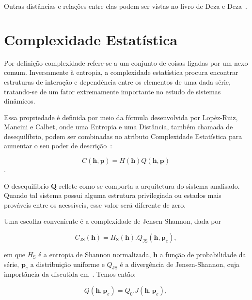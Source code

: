 Outras distâncias e relações entre elas podem ser vistas no livro de Deza e Deza~\citep{EncyclopediaofDistances}.

\section{Complexidade Estatística}

Por definição complexidade refere-se a um conjunto de coisas ligadas por um nexo comum. Inversamente à entropia, a complexidade estatística procura encontrar estruturas de interação e dependência entre os elementos de uma dada série, tratando-se de um fator extremamente importante no estudo de sistemas dinâmicos.

Essa propriedade é definida por meio da fórmula desenvolvida por Lopèz-Ruiz, Mancini e Calbet, onde uma Entropia e uma Distância, também chamada de desequilíbrio, podem ser combinadas no atributo Complexidade Estatística para aumentar o seu poder de descrição~\citep{article5,FELDMAN1998244,LOPEZRUIZ1995321}:

\begin{equation}
C(\bm h, \bm p) = H(\bm h)Q(\bm h, \bm p)
\end{equation}.

O desequilibrio $\bm Q$ reflete como se comporta a arquitetura do sistema analisado. Quando tal sistema possui alguma estrutura privilegiada ou estados mais prováveis entre os acessíveis, esse valor será diferente de zero.


Uma escolha conveniente é a complexidade de Jensen-Shannon, dada por

 \begin{equation}
 C_{\text{JS}}(\bm h) = H_{\text{S}}(\bm h) . Q_{\text{JS}}(\bm h, \bm p_e),
 \end{equation}
 
em que $H_{\text{S}}$ é a entropia de Shannon normalizada, $\bm h$ a função de probabilidade da série, $\bm p_e$ a distribuição uniforme e $Q_{\text{JS}}$ é a divergência de Jensen-Shannon, cuja importância da discutida em~\cite{LAMBERTI2004119}. Temos então:

\begin{equation}
Q(\bm h, \bm p_e) = Q_0 . J(\bm h, \bm p_e),
\end{equation}

